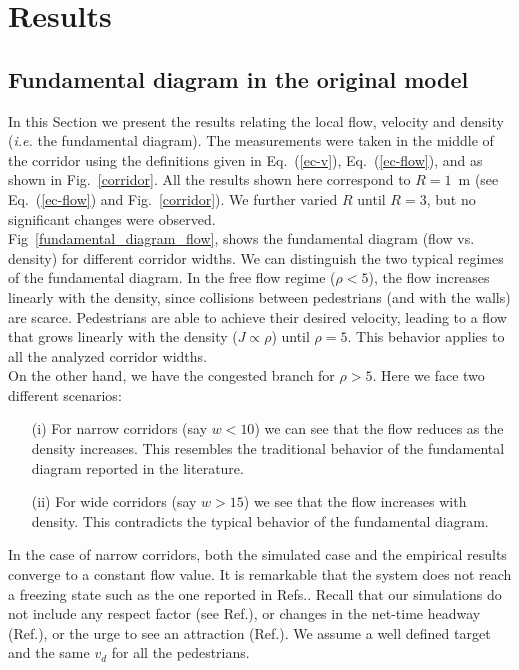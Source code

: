 \documentclass[preprint,12pt]{elsarticle}
\begin{document}
\section{\label{results}Results}


\subsection{\label{fundamental_diagram} Fundamental diagram in the original model}

In this Section we present the results relating the local flow, velocity and density (\textit{i.e.} the fundamental diagram). The measurements were taken in the middle of the corridor using the definitions given in Eq.~(\ref{ec-v}), Eq.~(\ref{ec-flow}), and as shown in Fig.~\ref{corridor}. All the results shown here correspond to $R=1$~m (see Eq.~(\ref{ec-flow}) and Fig.~\ref{corridor}). We further varied $R$ until $R=3$, but no significant changes were observed. \\

Fig~\ref{fundamental_diagram_flow}, shows the fundamental diagram (flow vs. density) for different corridor widths. We can distinguish the two typical regimes of the fundamental diagram. In the free flow regime ($\rho < 5$), the flow increases linearly with the density, since collisions between pedestrians (and with the walls) are scarce. Pedestrians are able to achieve their desired velocity, leading to a flow that grows linearly with the density ($J \propto \rho$) until $\rho=5$. This behavior applies to all the analyzed corridor widths.\\

On the other hand, we have the congested branch  for $\rho > 5$. Here we face two different scenarios:

\begin{itemize}
\item[(i)] For narrow corridors (say $w < 10$) we can see that the flow reduces as the density increases. This resembles the traditional behavior of the fundamental diagram reported in the literature. 
\item[(ii)] For wide corridors (say $w > 15$) we see that the flow increases with density. This contradicts the typical behavior of the fundamental diagram.   
\end{itemize}

In the case of narrow corridors, both the simulated case and the empirical results converge to a constant flow value. It is remarkable that the system does not reach a freezing state such as the one reported in Refs.\cite{kwak,lin}. Recall that our simulations do not include any respect factor (see Ref.\cite{parisi2}), or changes in the net-time headway (Ref.\cite{helbing3}), or the urge to see an attraction (Ref.\cite{kwak}). We assume a well defined target and the same $v_d$ for all the pedestrians.\\
\end{document}
